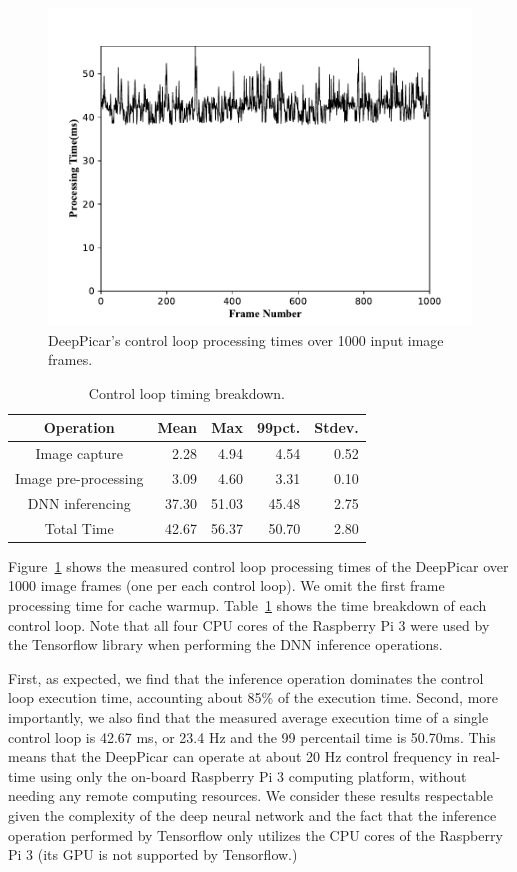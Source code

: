 
\begin{figure}[t]
  \centering
  \includegraphics[width=.5\textwidth]{figs/Fig7_new}
  \caption{DeepPicar's control loop processing times over 1000 input image frames.}
  \label{fig:control-loop-timing}
\end{figure}

\begin{table}[t]
  \centering
  \begin{tabular} {| c | r | r | r | r |}
    \hline
    \textbf{Operation} & \textbf{Mean} & \textbf{Max} &   \textbf{99pct.} & \textbf{Stdev.} \\ \hline
    Image capture        & 2.28  &  4.94 &  4.54  & 0.52 \\ \hline
    Image pre-processing & 3.09  &  4.60 &  3.31  & 0.10 \\ \hline
    DNN inferencing      & 37.30 & 51.03 & 45.48  & 2.75 \\ \hline
    Total Time           & 42.67 & 56.37 & 50.70  & 2.80 \\ \hline
  \end{tabular}
  \caption{Control loop timing breakdown.}
  \label{tbl:control-loop-breakdown}
\end{table}

Figure~\ref{fig:control-loop-timing} shows the measured control loop 
processing times of the DeepPicar over 1000 image frames (one per each
control loop). We omit the first frame processing time for cache
warmup. Table~\ref{tbl:control-loop-breakdown} shows the time
breakdown of each control loop. Note that all four CPU cores of the
Raspberry Pi 3 were used by the Tensorflow library when performing the
DNN inference operations.

First, as expected, we find that the inference operation
dominates the control loop execution time, accounting about 85\% of
the execution time.
Second, more importantly, we also find that the measured average
execution time of a single control loop is 42.67 ms, or 23.4 Hz and
the 99 percentail time is 50.70ms.
This means that the DeepPicar can operate
at about 20 Hz control frequency in real-time using only the on-board
Raspberry Pi 3 computing platform, without needing any remote computing
resources. We consider these results respectable given the complexity
of the deep neural network  and the fact that the inference operation
performed by Tensorflow only utilizes the CPU cores of the
Raspberry Pi 3 (its GPU is not supported by Tensorflow.)

